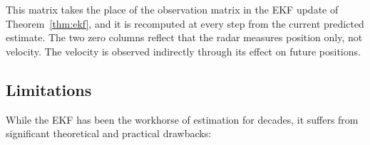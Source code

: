 \begin{example}
This matrix takes the place of the observation matrix in the EKF update of Theorem~\ref{thm:ekf}, and it is recomputed at every step from the current predicted estimate. The two zero columns reflect that the radar measures position only, not velocity. The velocity is observed indirectly through its effect on future positions.
\end{example}



\subsection*{Limitations}
While the EKF has been the workhorse of estimation for decades, it suffers from significant theoretical and practical drawbacks: 

